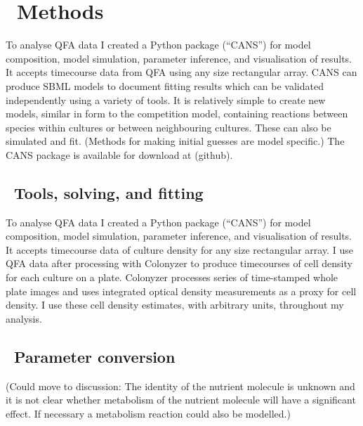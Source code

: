 \graphicspath{{images/}}

\section{\thesection~Methods}
\label{sec:methods}

To analyse QFA data I created a Python package (``CANS'') for model
composition, model simulation, parameter inference, and visualisation
of results. It accepts timecourse data from QFA using any size
rectangular array. CANS can produce SBML models to document fitting
results which can be validated independently using a variety of
tools. It is relatively simple to create new models, similar in form
to the competition model, containing reactions between species within
cultures or between neighbouring cultures. These can also be simulated
and fit. (Methods for making initial guesses are model specific.) The
CANS package is available for download at (github).

\subsection{\thesubsection~Tools, solving, and fitting}

To analyse QFA data I created a Python package (``CANS'') for model
composition, model simulation, parameter inference, and visualisation
of results. It accepts timecourse data of culture density for any size
rectangular array. I use QFA data after processing with Colonyzer
\citep{Lawless2010} to produce timecourses of cell density for each
culture on a plate. Colonyzer processes series of time-stamped whole
plate images and uses integrated optical density measurements as a
proxy for cell density. I use these cell density estimates, with
arbitrary units, throughout my analysis.



\subsection{\thesubsection~Parameter conversion}

(Could move to discussion: The identity of the
nutrient molecule is unknown and it is not clear whether metabolism of
the nutrient molecule will have a significant effect. If necessary a
metabolism reaction could also be modelled.)\\

